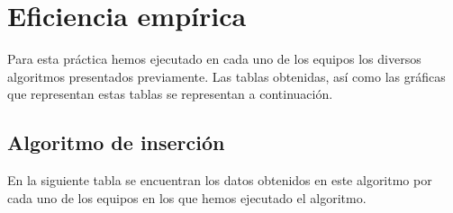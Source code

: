 \documentclass{homework}
\begin{document}
    \section{Eficiencia empírica}

    Para esta práctica hemos ejecutado en cada uno de los equipos los diversos algoritmos presentados previamente.
    Las tablas obtenidas, así como las gráficas que representan estas tablas se representan a continuación.

    \newpage
    
    \subsection{Algoritmo de inserción}
    
    En la siguiente tabla se encuentran los datos obtenidos en este algoritmo por cada uno de los
    equipos en los que hemos ejecutado el algoritmo. 
    
\end{document}
